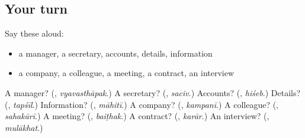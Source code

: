 \subsection*{Your turn}
Say these aloud:

\begin{itemize}
\raggedright
  \item a manager, a secretary, accounts, details, information
  \item a company, a colleague, a meeting, a contract, an interview
\end{itemize}

\begin{tcolorbox}[breakable,colback=teal!4,colframe=teal!35!black,title={Before you move on}]
A manager? (\textbf{}, \emph{vyavasthāpak}.) A secretary? (\textbf{}, \emph{saciv}.) Accounts? (\textbf{}, \emph{hiśeb}.) Details? (\textbf{}, \emph{tapśīl}.) Information? (\textbf{}, \emph{māhitī}.) A company? (\textbf{}, \emph{kampanī}.) A colleague? (\textbf{}, \emph{sahakārī}.) A meeting? (\textbf{}, \emph{baiṭhak}.) A contract? (\textbf{}, \emph{karār}.) An interview? (\textbf{}, \emph{mulākhat}.)
\end{tcolorbox}
